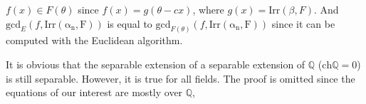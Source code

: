 \begin{remark}
    $f(x)\in F(\theta)$ since $f(x)=g(\theta-cx)$, where $g(x)=\mathrm{Irr}(\beta,F)$. And $\mathrm{gcd}_E(f,\mathrm{Irr(\alpha_n,F)})$ is equal to $\mathrm{gcd}_{F(\theta)}(f,\mathrm{Irr(\alpha_n,F)})$ since it can be computed with the Euclidean algorithm.
\end{remark}
\begin{remark}
    It is obvious that the separable extension of a separable extension of $\mathbb{Q}$ ($\mathrm{ch}\mathbb{Q}=0$) is still separable. However, it is true for all fields. The proof is omitted since the equations of our interest are mostly over $\mathbb{Q}$, 
\end{remark}